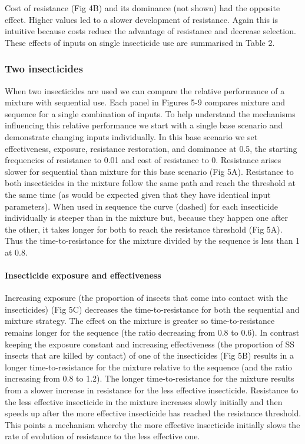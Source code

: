 \documentclass[11pt,]{article}
\let\oldparagraph\paragraph
\renewcommand{\paragraph}[1]{\oldparagraph{#1}\mbox{}}
\begin{document}
Cost of resistance (Fig 4B) and its dominance (not shown) had the
opposite effect. Higher values led to a slower development of
resistance. Again this is intuitive because costs reduce the advantage
of resistance and decrease selection. These effects of inputs on single
insecticide use are summarised in Table 2.

\subsubsection{Two insecticides}\label{two-insecticides}

When two insecticides are used we can compare the relative performance
of a mixture with sequential use. Each panel in Figures 5-9 compares
mixture and sequence for a single combination of inputs. To help
understand the mechanisms influencing this relative performance we start
with a single base scenario and demonstrate changing inputs
individually. In this base scenario we set effectiveness, exposure,
resistance restoration, and dominance at 0.5, the starting frequencies
of resistance to 0.01 and cost of resistance to 0. Resistance arises
slower for sequential than mixture for this base scenario (Fig 5A).
Resistance to both insecticides in the mixture follow the same path and
reach the threshold at the same time (as would be expected given that
they have identical input parameters). When used in sequence the curve
(dashed) for each insecticide individually is steeper than in the
mixture but, because they happen one after the other, it takes longer
for both to reach the resistance threshold (Fig 5A). Thus the
time-to-resistance for the mixture divided by the sequence is less than
1 at 0.8.

\paragraph{Insecticide exposure and
effectiveness}\label{insecticide-exposure-and-effectiveness}

Increasing exposure (the proportion of insects that come into contact
with the insecticides) (Fig 5C) decreases the time-to-resistance for
both the sequential and mixture strategy. The effect on the mixture is
greater so time-to-resistance remains longer for the sequence (the ratio
decreasing from 0.8 to 0.6). In contrast keeping the exposure constant
and increasing effectiveness (the proportion of SS insects that are
killed by contact) of one of the insecticides (Fig 5B) results in a
longer time-to-resistance for the mixture relative to the sequence (and
the ratio increasing from 0.8 to 1.2). The longer time-to-resistance for
the mixture results from a slower increase in resistance for the less
effective insecticide. Resistance to the less effective insecticide in
the mixture increases slowly initially and then speeds up after the more
effective insecticide has reached the resistance threshold. This points
a mechanism whereby the more effective insecticide initially slows the
rate of evolution of resistance to the less effective one.
\end{document}
